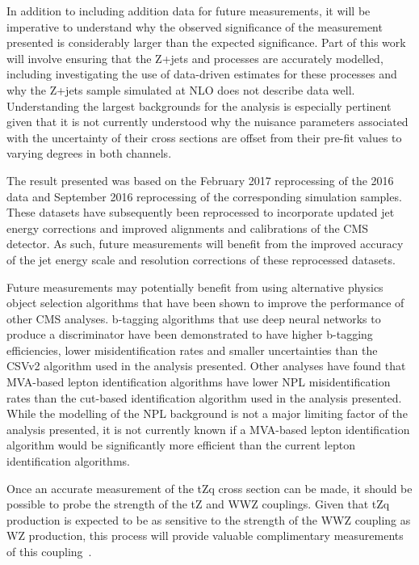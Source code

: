 In addition to including addition data for future measurements, it will be imperative to understand why the observed significance of the measurement presented is considerably larger than the expected significance.
Part of this work will involve ensuring that the Z+jets and \ttbar processes are accurately modelled, including investigating the use of data-driven estimates for these processes and why the Z+jets sample simulated at NLO does not describe data well.
Understanding the largest backgrounds for the analysis is especially pertinent given that it is not currently understood why the nuisance parameters associated with the uncertainty of their cross sections are offset from their pre-fit values to varying degrees in both channels.

The result presented was based on the February 2017 reprocessing of the 2016 data and September 2016 reprocessing of the corresponding simulation samples.
These datasets have subsequently been reprocessed to incorporate updated jet energy corrections and improved alignments and calibrations of the CMS detector.
As such, future measurements will benefit from the improved accuracy of the jet energy scale and resolution corrections of these reprocessed datasets.

Future measurements may potentially benefit from using alternative physics object selection algorithms that have been shown to improve the performance of other CMS analyses.
b-tagging algorithms that use deep neural networks to produce a discriminator have been demonstrated to have higher b-tagging efficiencies, lower misidentification rates and smaller uncertainties than the CSVv2 algorithm used in the analysis presented.
Other analyses have found that MVA-based lepton identification algorithms have lower NPL misidentification rates than the cut-based identification algorithm used in the analysis presented.
While the modelling of the NPL background is not a major limiting factor of the analysis presented, it is not currently known if a MVA-based lepton identification algorithm would be significantly more efficient than the current lepton identification algorithms.

Once an accurate measurement of the tZq cross section can be made, it should be possible to probe the strength of the tZ and WWZ couplings.
Given that tZq production is expected to be as sensitive to the strength of the WWZ coupling as WZ production, this process will provide valuable complimentary measurements of this coupling~\cite{Campbell:2013yla}.

